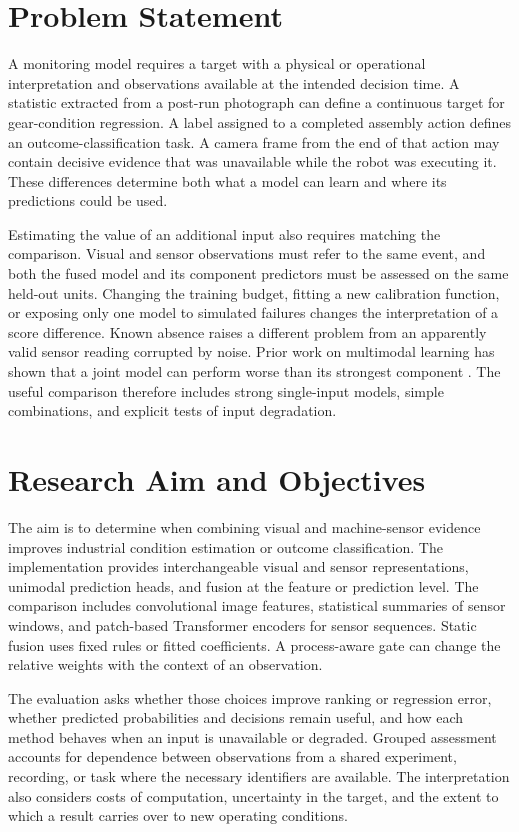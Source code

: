 \section{Problem Statement}
A monitoring model requires a target with a physical or operational interpretation and observations available at the intended decision time. A statistic extracted from a post-run photograph can define a continuous target for gear-condition regression. A label assigned to a completed assembly action defines an outcome-classification task. A camera frame from the end of that action may contain decisive evidence that was unavailable while the robot was executing it. These differences determine both what a model can learn and where its predictions could be used.

Estimating the value of an additional input also requires matching the comparison. Visual and sensor observations must refer to the same event, and both the fused model and its component predictors must be assessed on the same held-out units. Changing the training budget, fitting a new calibration function, or exposing only one model to simulated failures changes the interpretation of a score difference. Known absence raises a different problem from an apparently valid sensor reading corrupted by noise. Prior work on multimodal learning has shown that a joint model can perform worse than its strongest component \citep{Wang2020What}. The useful comparison therefore includes strong single-input models, simple combinations, and explicit tests of input degradation.

\section{Research Aim and Objectives}
The aim is to determine when combining visual and machine-sensor evidence improves industrial condition estimation or outcome classification. The implementation provides interchangeable visual and sensor representations, unimodal prediction heads, and fusion at the feature or prediction level. The comparison includes convolutional image features, statistical summaries of sensor windows, and patch-based Transformer encoders for sensor sequences. Static fusion uses fixed rules or fitted coefficients. A process-aware gate can change the relative weights with the context of an observation.

The evaluation asks whether those choices improve ranking or regression error, whether predicted probabilities and decisions remain useful, and how each method behaves when an input is unavailable or degraded. Grouped assessment accounts for dependence between observations from a shared experiment, recording, or task where the necessary identifiers are available. The interpretation also considers costs of computation, uncertainty in the target, and the extent to which a result carries over to new operating conditions.

